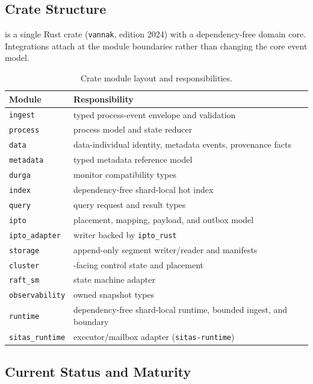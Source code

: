 \subsection{Crate Structure}

\vannak{} is a single Rust crate (\texttt{vannak}, edition 2024) with a
dependency-free domain core. Integrations attach at the module boundaries
rather than changing the core event model.

\begin{table}[htbp]
\centering
\begin{tabular}{ll}
\hline
Module & Responsibility \\
\hline
\texttt{ingest} & typed process-event envelope and validation \\
\texttt{process} & \durga{} process model and state reducer \\
\texttt{data} & data-individual identity, metadata events, provenance facts \\
\texttt{metadata} & typed metadata reference model \\
\texttt{durga} & \durga{} monitor compatibility types \\
\texttt{index} & dependency-free shard-local hot index \\
\texttt{query} & query request and result types \\
\texttt{ipto} & \ipto{} placement, mapping, payload, and outbox model \\
\texttt{ipto\_adapter} & \ipto{} writer backed by \texttt{ipto\_rust} \\
\texttt{storage} & append-only segment writer/reader and manifests \\
\texttt{cluster} & \raft{}-facing control state and placement \\
\texttt{raft\_sm} & \graft{} state machine adapter \\
\texttt{observability} & owned snapshot types \\
\texttt{runtime} & dependency-free shard-local runtime, bounded ingest, and
\sitas{} boundary \\
\texttt{sitas\_runtime} & \sitas{} executor/mailbox adapter
(\texttt{sitas-runtime}) \\
\hline
\end{tabular}
\caption{Crate module layout and responsibilities.}
\end{table}

\subsection{Current Status and Maturity}

